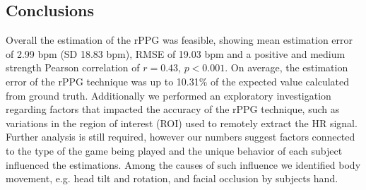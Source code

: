 \subsection{Conclusions}

Overall the estimation of the rPPG was feasible, showing mean estimation error of 2.99 bpm (SD 18.83 bpm), RMSE of 19.03 bpm and a positive and medium strength Pearson correlation of $r=0.43$, $p < 0.001$. On average, the estimation error of the rPPG technique was up to 10.31\% of the expected value calculated from ground truth. Additionally we performed an exploratory investigation regarding factors that impacted the accuracy of the rPPG technique, such as variations in the region of interest (ROI) used to remotely extract the HR signal. Further analysis is still required, however our numbers suggest factors connected to the type of the game being played and the unique behavior of each subject influenced the estimations. Among the causes of such influence we identified body movement, e.g. head tilt and rotation, and facial occlusion by subjects hand.

